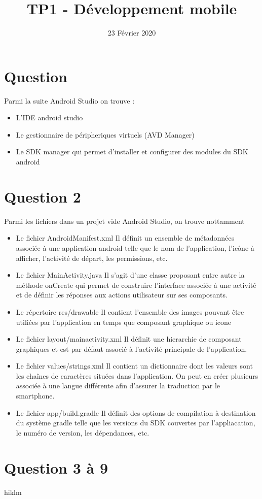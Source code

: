 \documentclass{article}
\title{TP1 - Développement mobile}
\date{23 Février 2020}
\begin{document}
\maketitle

\section{Question}
Parmi la suite Android Studio on trouve :
\begin{itemize}
\item L'IDE android studio
\item Le gestionnaire de péripheriques virtuels (AVD Manager)
\item Le SDK manager qui permet d'installer et configurer des modules du SDK android
\end{itemize}

\section{Question 2}
Parmi les fichiers dans un projet vide Android Studio, on trouve nottamment
\begin{itemize}
\item Le fichier AndroidManifest.xml
  Il définit un ensemble de métadonnées associée à une application android telle que le nom de l'application, l'icône à afficher, l'activité de départ, les permissions, etc.
\item Le fichier MainActivity.java
  Il s'agit d'une classe proposant entre autre la méthode onCreate qui permet de construire l'interface associée à une activité et de définir les réponses aux actions utilisateur sur ses composants.
\item Le répertoire res/drawable
  Il contient l'ensemble des images pouvant être utiliées par l'application en temps que composant graphique ou icone
\item Le fichier layout/main\textunderscore activity.xml
  Il définit une hierarchie de composant graphiques et est par défaut associé à l'activité principale de l'application.
\item Le fichier values/strings.xml
  Il contient un dictionnaire dont les valeurs sont les chaînes de caractères situées dans l'application. On peut en créer plusieurs associée à une langue différente afin d'assurer la traduction par le smartphone.
\item Le fichier app/build.gradle
  Il définit des options de compilation à destination du système gradle telle que les versions du SDK couvertes par l'appliacation, le numéro de version, les dépendances, etc.
\end{itemize}

\section{Question 3 à 9}
hiklm
\end{document}
